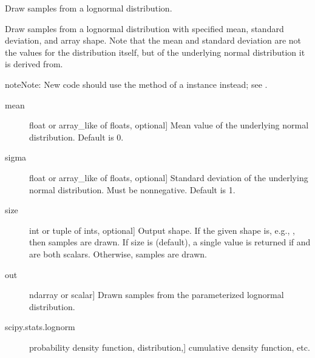 \documentclass[letterpaper,10pt,english]{sphinxmanual}
\begin{document}
\begin{fulllineitems}
\label{\detokenize{infrapy.utils:infrapy.utils.ref2sac.lognormal}}
Draw samples from a log\sphinxhyphen{}normal distribution.

Draw samples from a log\sphinxhyphen{}normal distribution with specified mean,
standard deviation, and array shape.  Note that the mean and standard
deviation are not the values for the distribution itself, but of the
underlying normal distribution it is derived from.

\begin{sphinxadmonition}{note}{Note:}
New code should use the  method of a 
instance instead; see .
\end{sphinxadmonition}
\begin{description}
\item[{mean}] \leavevmode{[}float or array\_like of floats, optional{]}
Mean value of the underlying normal distribution. Default is 0.

\item[{sigma}] \leavevmode{[}float or array\_like of floats, optional{]}
Standard deviation of the underlying normal distribution. Must be
non\sphinxhyphen{}negative. Default is 1.

\item[{size}] \leavevmode{[}int or tuple of ints, optional{]}
Output shape.  If the given shape is, e.g., , then
 samples are drawn.  If size is  (default),
a single value is returned if  and  are both scalars.
Otherwise,  samples are drawn.

\end{description}
\begin{description}
\item[{out}] \leavevmode{[}ndarray or scalar{]}
Drawn samples from the parameterized log\sphinxhyphen{}normal distribution.

\end{description}
\begin{description}
\item[{scipy.stats.lognorm}] \leavevmode{[}probability density function, distribution,{]}
cumulative density function, etc.


\end{description}
\end{fulllineitems}
\end{document}
